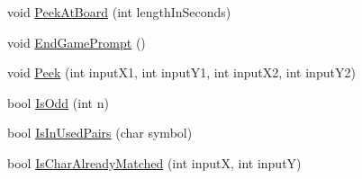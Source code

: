 \begin{DoxyCompactItemize}
\item 
void \hyperlink{classMemoryMatch_a56bf6c64798545d880f6d061464ae5a2}{Peek\-At\-Board} (int length\-In\-Seconds)
\item 
void \hyperlink{classMemoryMatch_a5a3232cd99dddddc6af5d5dc050087f7}{End\-Game\-Prompt} ()
\item 
void \hyperlink{classMemoryMatch_ae78665422f8d46d0c4639916f494845c}{Peek} (int input\-X1, int input\-Y1, int input\-X2, int input\-Y2)
\item 
bool \hyperlink{classMemoryMatch_a2cdc3fbc35524564a651e3cc1d5d03df}{Is\-Odd} (int n)
\item 
bool \hyperlink{classMemoryMatch_a7f3998ff0f59a063a493156c2d00eca2}{Is\-In\-Used\-Pairs} (char symbol)
\item 
bool \hyperlink{classMemoryMatch_acf4047dc2a34d4045a6a240253cb5600}{Is\-Char\-Already\-Matched} (int input\-X, int input\-Y)
\end{DoxyCompactItemize}
